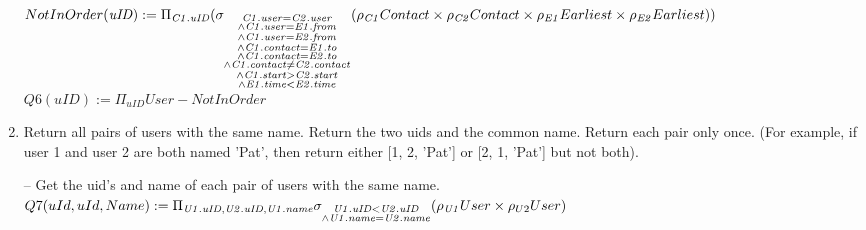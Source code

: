\documentclass{article}
\newcommand{\var}[1]{\mathit{#1}}
\begin{document}
\begin{enumerate}
{$
NotInOrder(\var{uID}) := \\ [5pt]
	\Pi_{\var{C1.uID}}
	(\sigma_{\substack{\var{C1.user} = \var{C2.user} \\
		\wedge \var{C1.user} = \var{E1.from} \\
		\wedge \var{C1.user} = \var{E2.from} \\
		\wedge \var{C1.contact} = \var{E1.to} \\
		\wedge \var{C1.contact} = \var{E2.to} \\
		\wedge \var{C1.contact} \neq \var{C2.contact} \\
		\wedge \var{C1.start} > \var{C2.start} \\
		\wedge \var{E1.time} < \var{E2.time}}}
		(\rho_{\var{C1}} Contact \times \rho_{\var{C2}} Contact
		\times \rho_{\var{E1}} Earliest \times \rho_{\var{E2}} Earliest)) \\ [5pt]
$
$
Q6(uID) := 
	\Pi_{\var{uID}} User - NotInOrder
$
}
\item   %
Return all pairs of users with the same name. Return the two uids and the common name. Return
each pair only once. (For example, if user 1 and user 2 are both named 'Pat', then return either [1, 2,
'Pat'] or [2, 1, 'Pat'] but not both). \\ [5pt]
\large{
\hspace*{1cm} -- Get the uid's and name of each pair of users with the same name. \\ [5 pt]
$
Q7(uId, uId, Name) := \Pi_{\var{U1.uID}, \var{U2.uID}, \var{U1.name}}
	 \sigma_{\substack{{\var{U1.uID}}  <  \var{U2.uID} \\
	  \wedge \var{U1.name} = \var{U2.name}}} (\rho_{\var{U1}} User \times \rho_{U2}User) \\ [5pt]
$

}
\end{enumerate}
\end{document}
